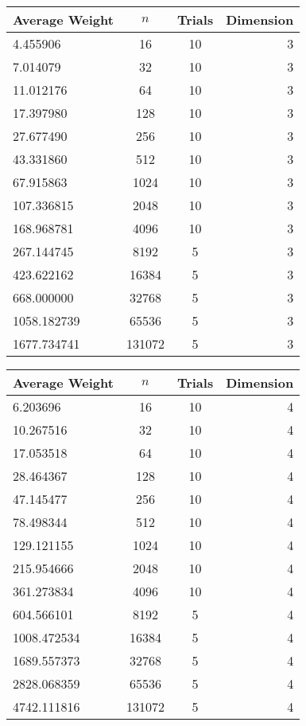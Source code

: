 \documentclass{article}
\begin{document}
\begin{tabular} {l | c | c| r}
	Average Weight & $n$ & Trials & Dimension \\
	\hline 
	4.455906 & 16 & 10 & 3 \\ 
	7.014079 & 32 & 10 & 3 \\ 
	11.012176 & 64 & 10 & 3 \\ 
	17.397980 & 128 & 10 & 3 \\ 
	27.677490 & 256 & 10 & 3 \\ 
	43.331860 & 512 & 10 & 3 \\ 
	67.915863 & 1024 & 10 & 3 \\ 
	107.336815 & 2048 & 10 & 3 \\ 
	168.968781 & 4096 & 10 & 3 \\ 
	267.144745 & 8192 & 5 & 3 \\ 
	423.622162 & 16384 & 5 & 3 \\ 
	668.000000 & 32768 & 5 & 3 \\ 
	1058.182739 & 65536 & 5 & 3 \\ 
	1677.734741 & 131072 & 5 & 3 \\
\end{tabular}

\begin{tabular} {l | c | c| r}
	Average Weight & $n$ & Trials & Dimension \\
	\hline 
	6.203696 & 16 & 10 & 4 \\ 
	10.267516 & 32 & 10 & 4 \\ 
	17.053518 & 64 & 10 & 4 \\ 
	28.464367 & 128 & 10 & 4 \\ 
	47.145477 & 256 & 10 & 4 \\ 
	78.498344 & 512 & 10 & 4 \\ 
	129.121155 & 1024 & 10 & 4 \\ 
	215.954666 & 2048 & 10 & 4 \\ 
	361.273834 & 4096 & 10 & 4 \\ 
	604.566101 & 8192 & 5 & 4 \\ 
	1008.472534 & 16384 & 5 & 4 \\ 
	1689.557373 & 32768 & 5 & 4 \\ 
	2828.068359 & 65536 & 5 & 4 \\
	4742.111816 & 131072 & 5 & 4 \\
\end{tabular}
\end{document}
